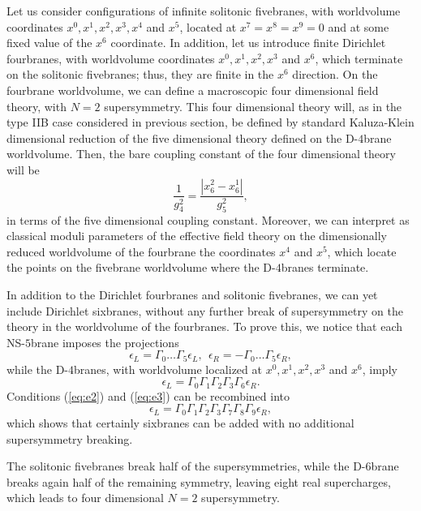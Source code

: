   
Let us consider configurations of infinite solitonic fivebranes,
with worldvolume coordinates $x^0,x^1,x^2,x^3,x^4$ and $x^5$,
located at $x^7=x^8=x^9=0$ and at some fixed value of the $x^6$
coordinate. In addition, let us introduce finite Dirichlet
fourbranes, with worldvolume coordinates $x^0,x^1,x^2,x^3$ and
$x^6$, which terminate on the solitonic fivebranes; thus, they
are finite in the $x^6$ direction. On the fourbrane worldvolume,
we can define a macroscopic four dimensional field theory, with
$N=2$ supersymmetry. This four dimensional theory will, as in the
type IIB case considered in previous section, be defined by
standard Kaluza-Klein dimensional reduction of the five
dimensional theory defined on the D-$4$brane worldvolume.
Then, the bare coupling constant of the four dimensional theory
will be
\begin{equation}
\frac {1}{g_4^2} = \frac {|x_6^2-x_6^1|}{g_5^2},
\label{eq:e1}
\end{equation}
in terms of the five dimensional coupling constant. Moreover, we
can interpret as classical moduli parameters of the effective
field theory on the dimensionally reduced worldvolume of the
fourbrane the coordinates $x^4$ and $x^5$, which locate the
points on the fivebrane worldvolume where the D-$4$branes
terminate.
  
In addition to the Dirichlet fourbranes and solitonic fivebranes, we can
yet include Dirichlet sixbranes, without any further break of
supersymmetry on the theory in the worldvolume of the fourbranes.
To prove this, we notice that each NS-$5$brane imposes the projections
\begin{equation}
\epsilon_L = \Gamma_0 \ldots \Gamma_5 \epsilon_L, \: \:
\epsilon_R = - \Gamma_0 \ldots \Gamma_5 \epsilon_R,
\label{eq:e2}
\end{equation}
while the D-$4$branes, with worldvolume localized at 
$x^0,x^1,x^2,x^3$ and $x^6$, imply
\begin{equation}
\epsilon_L = \Gamma_0 \Gamma_1 \Gamma_2 \Gamma_3 \Gamma_6
\epsilon_R.
\label{eq:e3}
\end{equation}
Conditions (\ref{eq:e2}) and (\ref{eq:e3}) can be recombined into
\begin{equation}
\epsilon_L = \Gamma_0 \Gamma_1 \Gamma_2 \Gamma_3 \Gamma_7
\Gamma_8 \Gamma_9 \epsilon_R,
\label{eq:e4}
\end{equation}
which shows that certainly sixbranes can be added with no
additional supersymmetry breaking.
  
The solitonic fivebranes break half of the supersymmetries, while
the D-$6$brane breaks again half of the remaining symmetry,
leaving eight real supercharges, which leads to four dimensional
$N=2$ supersymmetry.
  
